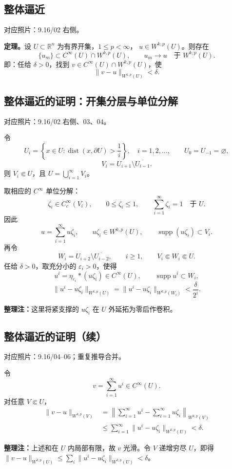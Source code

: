 \documentclass[UTF8,a4paper,11pt,fontset=fandol]{ctexart}
\newcommand{\R}{\mathbb R}
\newcommand{\ednote}[1]{\par{\small\color{notegray}\textbf{整理注：}#1}\par}
\newcommand{\source}[1]{{\small\color{notegray}对应照片：#1。}\par}
\begin{document}
\subsection{整体逼近}
\source{9.16/02 右侧}
\textbf{定理。}设 $U\subset\R^n$ 为有界开集，$1\leq p<\infty$，
$u\in W^{k,p}(U)$。则存在
\[
\{u_m\}\subset C^\infty(U)\cap W^{k,p}(U),\qquad
u_m\longrightarrow u\quad\text{于 }W^{k,p}(U).
\]
即：任给 $\delta>0$，找到 $v\in C^\infty(U)\cap W^{k,p}(U)$，使
\[
\|v-u\|_{W^{k,p}(U)}<\delta.
\]

\newpage
\subsection*{整体逼近的证明：开集分层与单位分解}
\source{9.16/02 右侧、03、04}
令
\[
U_i=\left\{x\in U:\operatorname{dist}(x,\partial U)>\frac1i\right\},
\quad i=1,2,\ldots,\qquad U_0=U_{-1}=\varnothing,
\]
\[
V_i=U_{i+1}\setminus\overline{U_{i-1}}.
\]
则 $V_i\Subset U$，且 $U=\bigcup_{i=1}^\infty V_i$。
\begin{center}
\end{center}
取相应的 $C^\infty$ 单位分解：
\[
\zeta_i\in C_c^\infty(V_i),\qquad 0\leq\zeta_i\leq1,
\qquad\sum_{i=1}^\infty\zeta_i=1\quad\text{于 }U.
\]
因此
\[
u=\sum_{i=1}^\infty u\zeta_i,\qquad
u\zeta_i\in W^{k,p}(U),\qquad\operatorname{supp}(u\zeta_i)\subset V_i.
\]
再令
\[
W_i=U_{i+2}\setminus\overline{U_{i-2}},\qquad i\geq1,
\qquad V_i\Subset W_i\Subset U.
\]
任给 $\delta>0$，取充分小的 $\varepsilon_i>0$，使得
\[
u^i=\eta_{\varepsilon_i}*(u\zeta_i)\in C^\infty(U),\qquad
\operatorname{supp}u^i\subset W_i,
\]
\[
\|u^i-u\zeta_i\|_{W^{k,p}(U)}
=\|u^i-u\zeta_i\|_{W^{k,p}(W_i)}<\frac{\delta}{2^i}.
\]
\ednote{这里将紧支撑的 $u\zeta_i$ 在 $U$ 外延拓为零后作卷积。}

\newpage
\subsection*{整体逼近的证明（续）}
\source{9.16/04--06；重复推导合并}
令
\[
v=\sum_{i=1}^\infty u^i\in C^\infty(U).
\]
对任意 $V\Subset U$，
\[
\begin{aligned}
\|v-u\|_{W^{k,p}(V)}
&=\left\|\sum_{i=1}^\infty u^i-\sum_{i=1}^\infty u\zeta_i\right\|_{W^{k,p}(V)}\\
&\leq\sum_{i=1}^\infty\|u^i-u\zeta_i\|_{W^{k,p}(U)}<\delta.
\end{aligned}
\]
\ednote{上述和在 $U$ 内局部有限，故 $v$ 光滑。令 $V$ 递增穷尽 $U$，即得
$\|v-u\|_{W^{k,p}(U)}\leq\sum_i\|u^i-u\zeta_i\|_{W^{k,p}(U)}<\delta$。}
\end{document}
